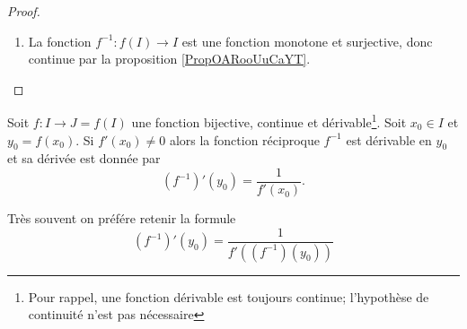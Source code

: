 \begin{proof}
\begin{enumerate}
\item

    La fonction \( f^{-1}\colon f(I)\to I\) est une fonction monotone et surjective, donc continue par la proposition \ref{PropOARooUuCaYT}.
  

    \end{enumerate}
\end{proof}

\begin{proposition} \label{PropMRBooXnnDLq}
    Soit \( f\colon I\to J=f(I)\) une fonction bijective, continue et dérivable\footnote{Pour rappel, une fonction dérivable est toujours continue; l'hypothèse de continuité n'est pas nécessaire}. Soit \( x_0\in I\) et \( y_0=f(x_0)\). Si \( f'(x_0)\neq 0\) alors la fonction réciproque \( f^{-1}\) est dérivable en \( y_0\) et sa dérivée est donnée par
    \begin{equation}    
        (f^{-1})'(y_0)=\frac{1}{ f'(x_0) }.
    \end{equation}
\end{proposition}
 
  \begin{Aretenir}
 Très souvent on préfére retenir la formule
    \begin{equation}\label{EqWWAooBRFNsv}
      (f^{-1})'(y_0) = \frac{1}{f'\left((f^{-1})(y_0)\right)}
    \end{equation}
  \end{Aretenir}


